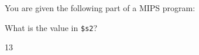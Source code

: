 

\renewcommand\AUTHOR{aoro1@cougars.ccis.edu} %


\topmattertwo

\nextq
You are given the following part of a MIPS program:

What is the value in \verb!$s2!?
\\   
\ANSWER
\begin{answercode}
13
\end{answercode}

\newpage

